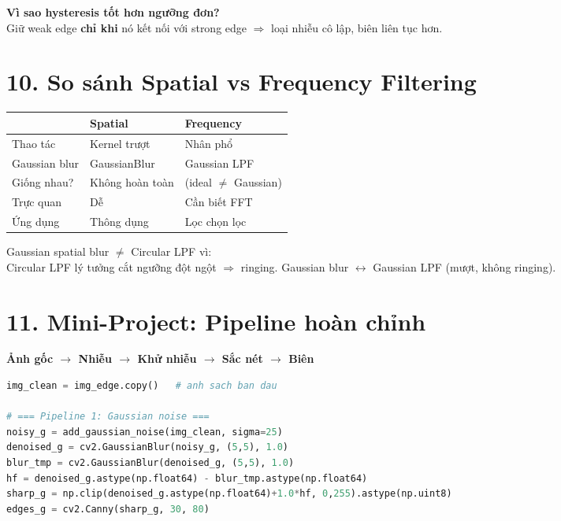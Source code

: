 \documentclass[9pt,landscape,a4paper]{extarticle}
\begin{document}
\begin{multicols*}{3}
\begin{multicols*}{3}
\begin{multicols}{3}
\begin{tipbox}
\textbf{Vì sao hysteresis tốt hơn ngưỡng đơn?}\\
Giữ weak edge \textbf{chỉ khi} nó kết nối với strong edge $\Rightarrow$ loại nhiễu cô lập, biên liên tục hơn.
\end{tipbox}

\section{10. So sánh Spatial vs Frequency Filtering}

\begin{center}\small
\begin{tabular}{@{}lll@{}}
\toprule
 & Spatial & Frequency \\
\midrule
Thao tác & Kernel trượt & Nhân phổ \\
Gaussian blur & GaussianBlur & Gaussian LPF \\
Giống nhau? & Không hoàn toàn & (ideal $\neq$ Gaussian) \\
Trực quan & Dễ & Cần biết FFT \\
Ứng dụng & Thông dụng & Lọc chọn lọc \\
\bottomrule
\end{tabular}
\end{center}

\begin{notebox}
Gaussian spatial blur $\neq$ Circular LPF vì:\\
Circular LPF lý tưởng cắt ngưỡng đột ngột $\Rightarrow$ ringing.
Gaussian blur $\leftrightarrow$ Gaussian LPF (mượt, không ringing).
\end{notebox}

\section{11. Mini-Project: Pipeline hoàn chỉnh}

\begin{center}
\textbf{Ảnh gốc $\to$ Nhiễu $\to$ Khử nhiễu $\to$ Sắc nét $\to$ Biên}
\end{center}

\begin{lstlisting}[language=Python]
img_clean = img_edge.copy()   # anh sach ban dau

# === Pipeline 1: Gaussian noise ===
noisy_g = add_gaussian_noise(img_clean, sigma=25)
denoised_g = cv2.GaussianBlur(noisy_g, (5,5), 1.0)
blur_tmp = cv2.GaussianBlur(denoised_g, (5,5), 1.0)
hf = denoised_g.astype(np.float64) - blur_tmp.astype(np.float64)
sharp_g = np.clip(denoised_g.astype(np.float64)+1.0*hf, 0,255).astype(np.uint8)
edges_g = cv2.Canny(sharp_g, 30, 80)


\end{lstlisting}
\end{multicols}
\end{multicols*}
\end{multicols*}
\end{document}
